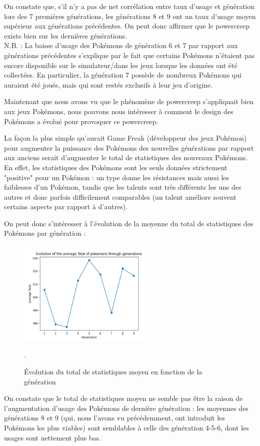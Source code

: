\documentclass[a4paper,12pt]{article}
\begin{document}
On constate que, s'il n'y a pas de net corrélation entre taux d'usage et
génération lors des 7 premières générations, les générations 8 et 9 ont un taux
d'usage moyen supérieur aux générations précédentes. On peut donc affirmer que
le powercreep existe bien sur les dernières générations.\\
N.B. : La baisse d'usage des Pokémons de génération 6 et 7 par rapport aux
générations précédentes s'explique par le fait que certains Pokémons n'étaient pas
encore disponible sur le simulateur/dans les jeux lorsque les données ont été
collectées. En particulier, la génération 7 possède de nombreux Pokémons qui
auraient été joués, mais qui sont restés exclusifs à leur jeu d'origine.


Maintenant que nous avons vu que le phénomène de powercreep s'appliquait bien
aux jeux Pokémons, nous pouvons nous intéresser à comment le design des Pokémons
a évolué pour provoquer ce powercreep.

La façon la plus simple qu'aurait Game Freak (développeur des jeux Pokémon) pour
augmenter la puissance des Pokémons des nouvelles générations par rapport aux
anciens serait d'augmenter le total de statistiques des nouveaux Pokémons. En
effet, les statistiques des Pokémons sont les seuls données strictement
"positive" pour un Pokémon :  un type donne les résistances mais aussi les
faiblesses d'un Pokémon, tandis que les talents sont très différents les uns des
autres et donc parfois difficilement comparables (un talent améliore souvent
certains aspects par rapport à d'autres).

On peut donc s'intéresser à l'évolution de la moyenne du total de statistiques
des Pokémons par génération :

\begin{figure}[htbp]
    \centering
    \includegraphics[width=0.6\textwidth]{Image/avg_total_per_generation.png}
    \caption{Évolution du total de statistiques moyen en fonction de la
    génération}.
    \label{fig:image5}
\end{figure}
\newpage
On constate que le total de statistiques moyen ne semble pas être la raison de
l'augmentation d'usage des Pokémons de dernière génération : les moyennes des
générations 8 et 9 (qui, nous l'avons vu précédemment, ont introduit les
Pokémons les plus viables) sont semblables à celle des génération 4-5-6, dont
les usages sont nettement plus bas.
\end{document}

